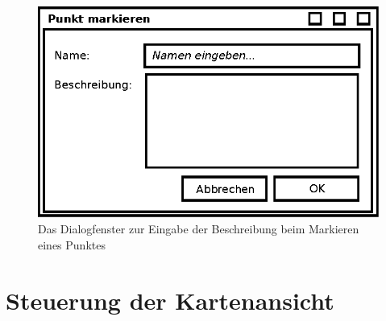 \documentclass[10pt]{scrreprt}
\begin{document}
\begin{figure}
	\centering
	\includegraphics[scale=0.9]{GUI-Markieren.eps}
	\caption{Das Dialogfenster zur Eingabe der Beschreibung beim Markieren eines Punktes}
\end{figure}

\clearpage
\pagebreak

\section{Steuerung der Kartenansicht}

\vspace{3mm}
\end{document}
